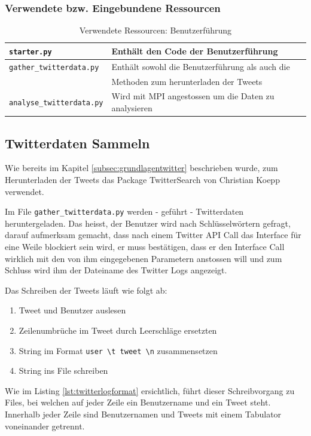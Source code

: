 \subsubsection{Verwendete bzw. Eingebundene Ressourcen}
\begin{table}[H]
\begin{center}
\begin{tabular}{|l|l|}
	\hline
	\lstinline$starter.py$ & Enthält den Code der Benutzerführung \\ \hline
	\lstinline$gather_twitterdata.py$ & Enthält sowohl die Benutzerführung als auch die \\
	& Methoden zum herunterladen der Tweets \\ \hline
	\lstinline$analyse_twitterdata.py$ & Wird mit MPI angestossen um die Daten zu analysieren \\ \hline
\end{tabular}
\caption{Verwendete Ressourcen: Benutzerführung}
\end{center}
\end{table}


\subsection{Twitterdaten Sammeln}
Wie bereits im Kapitel \ref{subsec:grundlagentwitter} beschrieben wurde, zum Herunterladen der Tweets das Package TwitterSearch von Christian Koepp\cite{twittersearch} verwendet.

Im File \lstinline$gather_twitterdata.py$ werden - geführt - Twitterdaten heruntergeladen. Das heisst, der Benutzer wird nach Schlüsselwörtern gefragt, darauf aufmerksam gemacht, dass nach einem Twitter API Call das Interface für eine Weile blockiert sein wird, er muss bestätigen, dass er den Interface Call wirklich mit den von ihm eingegebenen Parametern anstossen will und zum Schluss wird ihm der Dateiname des Twitter Logs angezeigt.

Das Schreiben der Tweets läuft wie folgt ab:
\begin{enumerate}
	\item Tweet und Benutzer auslesen
	\item Zeilenumbrüche im Tweet durch Leerschläge ersetzten
	\item String im Format \lstinline$user \t tweet \n$ zusammensetzen
	\item String ins File schreiben 
\end{enumerate}

Wie im Listing \ref{lst:twitterlogformat} ersichtlich, führt dieser Schreibvorgang zu Files, bei welchen auf jeder Zeile ein Benutzername und ein Tweet steht. Innerhalb jeder Zeile sind Benutzernamen und Tweets mit einem Tabulator voneinander getrennt.

